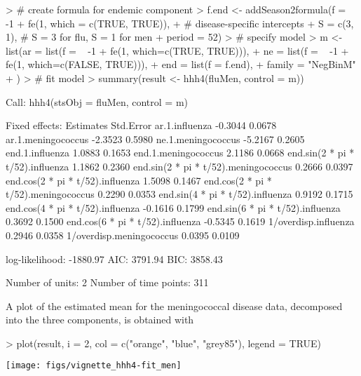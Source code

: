 \documentclass[a4paper,11pt]{article}
\begin{document}
\begin{Schunk}
\begin{Sinput}
> # create formula for endemic component
> f.end <- addSeason2formula(f = ~ -1 + fe(1, which = c(TRUE, TRUE)), 
+                                            # disease-specific intercepts
+                            S = c(3, 1),    # S = 3 for flu, S = 1 for men
+                            period = 52)
> # specify model
> m <- list(ar = list(f = ~ -1 + fe(1, which=c(TRUE, TRUE))), 
+           ne = list(f = ~ -1 + fe(1, which=c(FALSE, TRUE))), 
+           end = list(f = f.end),
+           family = "NegBinM"
+           )
> # fit model
> summary(result <- hhh4(fluMen, control = m))
\end{Sinput}
\begin{Soutput}
Call: 
hhh4(stsObj = fluMen, control = m)


Fixed effects: 
                                      Estimates  Std.Error
ar.1.influenza                          -0.3044     0.0678
ar.1.meningococcus                      -2.3523     0.5980
ne.1.meningococcus                      -5.2167     0.2605
end.1.influenza                          1.0883     0.1653
end.1.meningococcus                      2.1186     0.0668
end.sin(2 * pi * t/52).influenza         1.1862     0.2360
end.sin(2 * pi * t/52).meningococcus     0.2666     0.0397
end.cos(2 * pi * t/52).influenza         1.5098     0.1467
end.cos(2 * pi * t/52).meningococcus     0.2290     0.0353
end.sin(4 * pi * t/52).influenza         0.9192     0.1715
end.cos(4 * pi * t/52).influenza        -0.1616     0.1799
end.sin(6 * pi * t/52).influenza         0.3692     0.1500
end.cos(6 * pi * t/52).influenza        -0.5345     0.1619
1/overdisp.influenza                     0.2946     0.0358
1/overdisp.meningococcus                 0.0395     0.0109

log-likelihood:    -1880.97 
AIC:               3791.94 
BIC:               3858.43 

Number of units:          2 
Number of time points:    311 
\end{Soutput}
\end{Schunk}
A plot of the estimated mean for the meningococcal disease data, 
decomposed into the three components, is obtained with
\begin{center}
\begin{Schunk}
\begin{Sinput}
> plot(result, i = 2, col = c("orange", "blue", "grey85"), legend = TRUE)
\end{Sinput}
\end{Schunk}
\texttt{[image: figs/vignette\_hhh4-fit\_men]}
\end{center}
\end{document}
